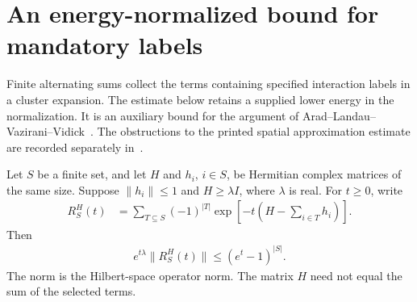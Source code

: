 \section{An energy-normalized bound for mandatory labels}

Finite alternating sums collect the terms containing specified interaction
labels in a cluster expansion. The estimate below retains a supplied lower
energy in the normalization. It is an auxiliary bound for the argument
of Arad--Landau--Vazirani--Vidick~\cite[lines 1270--1291 and
    1935--1968]{Arad2016RigorousRG}. The obstructions to the printed spatial
approximation estimate are recorded separately
in~\cite{gap:alvv16_cluster_approximation}.

\begin{lemma}
    \label{thm:mandatory_label_exp_norm}
    \leanok
    Let $S$ be a finite set, and let $H$ and $h_i$, $i\in S$, be Hermitian
    complex matrices of the same size. Suppose $\|h_i\|\leq1$ and
    $H\geq\lambda I$, where $\lambda$ is real. For $t\geq0$, write
    \begin{align}
        R_S^H(t)
         & =\sum_{T\subseteq S}(-1)^{|T|}
        \exp\!\left[-t\left(H-\sum_{i\in T}h_i\right)\right].
        \label{eq:mandatory_label_exp_sum}
    \end{align}
    Then
    \begin{align}
        e^{t\lambda}\|R_S^H(t)\|\leq(e^t-1)^{|S|}.
        \label{eq:mandatory_label_exp_norm}
    \end{align}
    The norm is the Hilbert-space operator norm. The matrix $H$ need not
    equal the sum of the selected terms.
\end{lemma}
